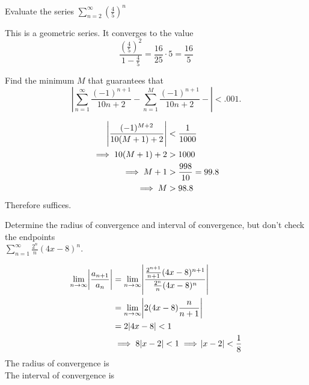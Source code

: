\documentclass[12pt,answers]{exam}
\begin{document}
\begin{questions}

\question[10]
Evaluate the series $\displaystyle \sum_{n=2}^\infty \left(\frac45\right)^n$
\begin{solution}
  This is a geometric series. It converges to the value
  \[
    \frac{(\frac45)^2}{1-\frac45} = \frac{16}{25} \cdot 5 = \boxed{\frac{16}{5}}
  \]
\end{solution}

\question[10]
Find the minimum $M$ that guarantees that
\[
  \left|
  \sum_{n=1}^\infty \frac{(-1)^{n+1}}{10n+2} -
  \sum_{n=1}^M \frac{(-1)^{n+1}}{10n+2} -
  \right| < .001.
\]
\begin{solution}
  \begin{align*}
    \abs{\frac{(-1)^{M+2}}{10(M+1) + 2}} & < \frac{1}{1000}        \\
    \implies 10(M+1)+2                   & > 1000                  \\
    \implies M+1                         & > \frac{998}{10} = 99.8 \\
    \implies M                           & > 98.8
  \end{align*}
  Therefore  suffices.
\end{solution}

\newpage
\question[10]
Determine the radius of convergence and interval of convergence, but don't check the endpoints
\\
$\sum_{n=1}^\infty \frac{2^n}{n} (4x-8)^n$.
\begin{solution}
  \begin{align*}
    \lim_{n\to\infty} \abs{\frac{a_{n+1}}{a_n}}
     & = \lim_{n\to\infty} \abs{\frac{\frac{2^{n+1}}{n+1}(4x-8)^{n+1}}{\frac{2^n}{n}(4x-8)^n}} \\
     & = \lim_{n\to\infty} \abs{2(4x-8) \frac{n}{n+1}}                                         \\
     & = 2\abs{4x-8} < 1                                                                       \\
     & \implies  8 \abs{x-2} < 1
    \implies \abs{x-2} < \frac18
  \end{align*}
  The radius of convergence is  \\
  The interval of convergence is 
\end{solution}


\end{questions}
\end{document}
